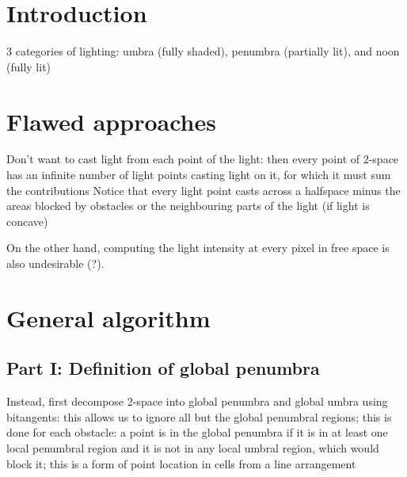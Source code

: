 \documentclass[9pt]{article}
\begin{document}
\section{Introduction}

3 categories of lighting: umbra (fully shaded), penumbra (partially lit), 
	and noon (fully lit)

\section{Flawed approaches}

Don't want to cast light from each point of the light: 
	then every point of 2-space
	has an infinite number of light points casting light on it,
	for which it must sum the contributions
	Notice that every light point casts across a halfspace minus the
	areas blocked by obstacles or the neighbouring parts of the light (if
	light is concave)
	
On the other hand, computing the light intensity at every pixel
	in free space is also undesirable (?).
	
			
\section{General algorithm}

\subsection{Part I: Definition of global penumbra}

Instead, first decompose 2-space into global penumbra and global umbra using bitangents:
	this allows us to ignore all but the global penumbral regions;
	this is done for each obstacle: a point is in the global penumbra
	if it is in at least one local penumbral region and it is not in any
	local umbral region, which would block it;
	this is a form of point location in cells from a line arrangement
			
\end{document}
